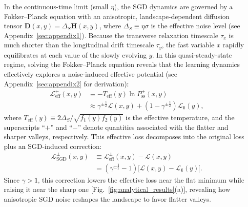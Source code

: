 \documentclass[aps,prx,reprint,superscriptaddress,longbibliography,nofootinbib,floatfix]{revtex4-2}
\begin{document}
In the continuous-time limit (small $\eta$), the SGD dynamics are governed by a Fokker--Planck equation with an anisotropic, landscape-dependent diffusion tensor $\mathbf{D}(x,y) = \Delta_S \mathbf{H}(x,y)$, where $\Delta_S \equiv \eta\sigma$ is the effective noise level (see Appendix~\ref{sec:appendix1}). Because the transverse relaxation timescale $\tau_x$ is much shorter than the longitudinal drift timescale $\tau_y$, the fast variable $x$ rapidly equilibrates at each value of the slowly evolving $y$. In this quasi-steady-state regime, solving the Fokker--Planck equation reveals that the learning dynamics effectively explores a noise-induced effective potential (see Appendix~\ref{sec:appendix2} for derivation):
\begin{equation}
\begin{split}
    \mathcal{L}_{\mathrm{eff}}^{\pm}(x,y)
    &\equiv -T_{\mathrm{eff}}(y)\ln P_\mathrm{ss}^{\pm}(x,y)  \\
    &\approx
    \gamma^{\pm\frac{1}{2}}\mathcal{L}(x,y)
    +\left(1-\gamma^{\pm\frac{1}{2}}\right)\mathcal{L}_0(y),
\end{split}
\label{eq:effective_loss_SGD}
\end{equation}
where $T_{\mathrm{eff}}(y) \equiv 2\Delta_S / \sqrt{f_1(y)f_2(y)}$ is the effective temperature, and the superscripts ``$+$'' and ``$-$'' denote quantities associated with the flatter and sharper valleys, respectively. This effective loss decomposes into the original loss plus an SGD-induced correction:
\begin{equation}
\begin{split}
    \mathcal{L}_{\mathrm{SGD}}^{\pm}(x,y)
    &\equiv \mathcal{L}_{\mathrm{eff}}^{\pm}(x,y)-\mathcal{L}(x,y) \\
    &= \left(\gamma^{\pm\frac{1}{2}}-1\right)
    \big[\mathcal{L}(x,y)-\mathcal{L}_0(y)\big].
\end{split}
\end{equation}
Since $\gamma > 1$, this correction lowers the effective loss near the flat minimum while raising it near the sharp one [Fig.~\ref{fig:analytical_results}(a)], revealing how anisotropic SGD noise reshapes the landscape to favor flatter valleys.
\end{document}
